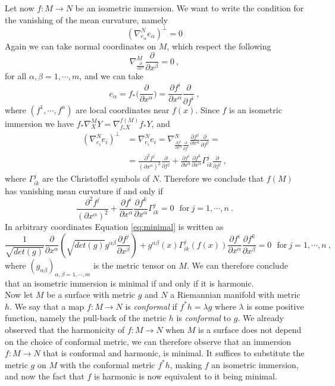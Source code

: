 Let now $f:M \to N$ be an isometric immersion. We want to write the condition for the vanishing of the mean curvature, namely
\[
    (\nabla^N_{e_\alpha} e_\alpha)^\perp = 0
\]
Again we can take normal coordinates on $M$, which respect the following
\[
    \nabla^M_{\frac{\partial}{\partial x^\alpha}}  \frac{\partial}{\partial x^\beta} = 0 \ ,
\]
for all $\alpha, \beta = 1, \cdots, m$, and we can take
\[
    e_\alpha = f_*\Big( \frac{\partial}{\partial x^\alpha} \Big) = \frac{\partial f^i}{\partial x^\alpha} \frac{\partial}{\partial f^i} \ ,
\]
where $(f^1, \cdots, f^n)$ are local coordinates near $f(x)$.
Since $f$ is an isometric immersion we have $f_* \nabla^M_X Y = \nabla^{f(M)}_{f_* X} f_* Y$, and
\[
\begin{split}
    (\nabla^N_{e_i} e_i)^\perp & = \nabla^N_{e_i} e_i = \nabla^N_{\frac{\partial f^i}{\partial x^\alpha} \frac{\partial}{\partial f^i}}  \frac{\partial f^j}{\partial x^\alpha} \frac{\partial}{\partial f^j} = \\
    & = \frac{\partial^2 f^j}{(\partial x^\alpha)^2} \frac{\partial}{\partial f^j} + \frac{\partial f^i}{\partial x^\alpha} \frac{\partial f^k}{\partial x^\alpha} \Gamma^j_{ik} \frac{\partial}{\partial f^j} \ ,
\end{split}
\]
where $\Gamma^j_{ik}$ are the Christoffel symbols of $N$. Therefore we conclude that $f(M)$ has vanishing mean curvature if and only if
\begin{equation}\label{eq:minimal}
    \frac{\partial^2 f^j}{(\partial x^\alpha)^2} + \frac{\partial f^i}{\partial x^\alpha} \frac{\partial f^k}{\partial x^\alpha} \Gamma^j_{ik}  = 0 \ \ \ \text{for} \ j=1, \cdots, n \ .
\end{equation}
In arbitrary coordinates Equation \ref{eq:minimal} is written as
\[
    \frac{1}{\sqrt{det(g)}} \frac{\partial}{\partial x^\alpha}(\sqrt{det(g)} g^{\alpha\beta} \frac{\partial f^j}{\partial x^\beta}) + g^{\alpha\beta}(x) \Gamma^j_{ik}(f(x)) \frac{\partial f^i}{\partial x^\alpha}  \frac{\partial f^k}{\partial x^\beta} = 0  \ \ \ \text{for} \ j=1, \cdots, n \ ,
\]
where $(g_{\alpha \beta})_{\alpha,\beta = 1,\cdots,m}$ is the metric tensor on $M$.
We can therefore conclude that an isometric immersion is minimal if and only if it is harmonic.\\
Now let $M$ be a surface with metric $g$ and $N$ a Riemannian manifold with metric $h$. We say that a map $f:M \to N$ is \textit{conformal} if $f^* h = \lambda g$ where $\lambda$ is some positive function, namely the pull-back of the metric $h$ is \textit{conformal} to $g$. We already observed that the harmonicity of $f:M \to N$ when $M$ is a surface does not depend on the choice of conformal metric, we can therefore observe that an immersion $f:M \to N$ that is conformal and harmonic, is minimal. It suffices to substitute the metric $g$ on $M$ with the conformal metric $f^* h$, making $f$ an isometric immersion, and now the fact that $f$ is harmonic is now equivalent to it being minimal.\\
